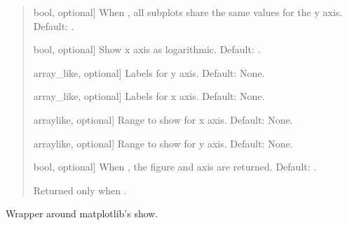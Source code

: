 \documentclass[letterpaper,10pt,english]{sphinxmanual}
\begin{document}
\begin{fulllineitems}
\begin{quote}
\begin{description}
\begin{description}
\sphinxlineitem{\sphinxstylestrong{sharey}}{[}bool, optional{]}
\sphinxAtStartPar
When , all subplots share the same values for the y axis.
Default: .

\sphinxlineitem{\sphinxstylestrong{log}}{[}bool, optional{]}
\sphinxAtStartPar
Show x axis as logarithmic. Default: .

\sphinxlineitem{\sphinxstylestrong{ylabels}}{[}array\_like, optional{]}
\sphinxAtStartPar
Labels for y axis. Default: None.

\sphinxlineitem{\sphinxstylestrong{xlabels}}{[}array\_like, optional{]}
\sphinxAtStartPar
Labels for x axis. Default: None.

\sphinxlineitem{\sphinxstylestrong{range\_x}}{[}array\sphinxhyphen{}like, optional{]}
\sphinxAtStartPar
Range to show for x axis. Default: None.

\sphinxlineitem{\sphinxstylestrong{range\_y}}{[}array\sphinxhyphen{}like, optional{]}
\sphinxAtStartPar
Range to show for y axis. Default: None.

\sphinxlineitem{\sphinxstylestrong{returns}}{[}bool, optional{]}
\sphinxAtStartPar
When , the figure and axis are returned. Default: .

\end{description}

\begin{description}
\sphinxAtStartPar
Returned only when .

\end{description}

\end{description}\end{quote}

\end{fulllineitems}


\begin{fulllineitems}
\label{\detokenize{modules/dsptools.plots:dsptools.plots.show}}
\pysigstartsignatures
{}
\pysigstopsignatures
\sphinxAtStartPar
Wrapper around matplotlib’s show.

\end{fulllineitems}
\end{document}
